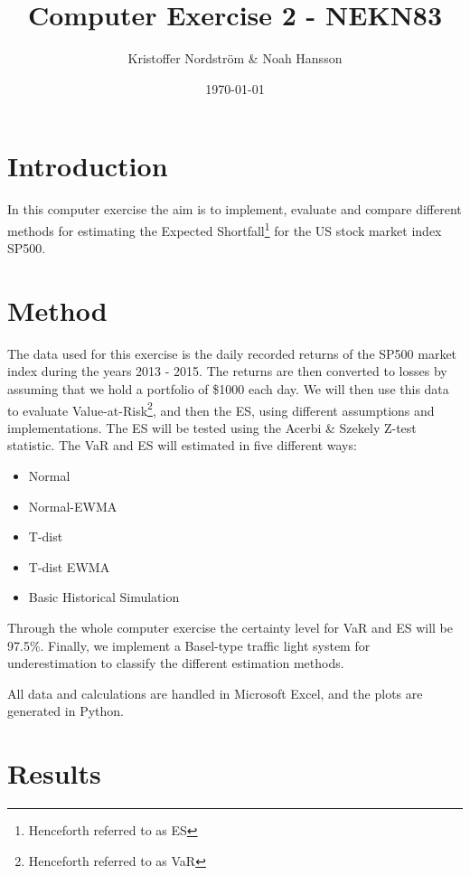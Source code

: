 \documentclass[a4paper]{article}
\title{Computer Exercise 2 - NEKN83}
\author{Kristoffer Nordström \& Noah Hansson}
\date{\today}
\begin{document}
\maketitle


\section{Introduction}
In this computer exercise the aim is to implement, evaluate and compare different methods for estimating the Expected Shortfall\footnote{Henceforth referred to as ES} for the US stock market index SP500.

\section{Method}
The data used for this exercise is the daily recorded returns of the SP500 market index during the years 2013 - 2015. The returns are then converted to losses by assuming that we hold a portfolio of \$1000 each day. We will then use this data to evaluate Value-at-Risk\footnote{Henceforth referred to as VaR}, and then the ES, using different assumptions and implementations. The ES will be tested using the Acerbi \& Szekely Z-test statistic. The VaR and ES will estimated in five different ways:
\begin{itemize}
    \item Normal
    \item Normal-EWMA
    \item T-dist
    \item T-dist EWMA
    \item Basic Historical Simulation
\end{itemize}
Through the whole computer exercise the certainty level for VaR and ES will be 97.5\%. Finally, we implement a Basel-type traffic light system for underestimation to classify the different estimation methods.

All data and calculations are handled in Microsoft Excel, and the plots are generated in Python.

\section{Results}
\end{document}
